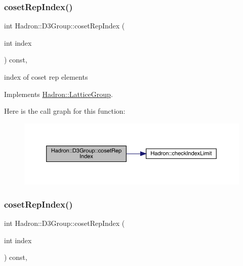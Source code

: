 \subsubsection{\texorpdfstring{cosetRepIndex()}{cosetRepIndex()}\hspace{0.1cm}{\footnotesize\ttfamily [1/2]}}
{\footnotesize\ttfamily int Hadron\+::\+D3\+Group\+::coset\+Rep\+Index (\begin{DoxyParamCaption}\item[{int}]{index }\end{DoxyParamCaption}) const\hspace{0.3cm}{\ttfamily [inline]}, {\ttfamily [virtual]}}

index of coset rep elements 

Implements \mbox{\hyperlink{structHadron_1_1LatticeGroup_a7e3b9b5e2f596e6c40d64aa939a3ad6c}{Hadron\+::\+Lattice\+Group}}.

Here is the call graph for this function\+:
\nopagebreak
\begin{figure}[H]
\begin{center}
\leavevmode
\includegraphics[width=350pt]{de/de1/structHadron_1_1D3Group_a361cfe22330be972fe6d49bc2e1af871_cgraph}
\end{center}
\end{figure}
\mbox{\label{structHadron_1_1D3Group_a361cfe22330be972fe6d49bc2e1af871}} 
\subsubsection{\texorpdfstring{cosetRepIndex()}{cosetRepIndex()}\hspace{0.1cm}{\footnotesize\ttfamily [2/2]}}
{\footnotesize\ttfamily int Hadron\+::\+D3\+Group\+::coset\+Rep\+Index (\begin{DoxyParamCaption}\item[{int}]{index }\end{DoxyParamCaption}) const\hspace{0.3cm}{\ttfamily [inline]}, {\ttfamily [virtual]}}


